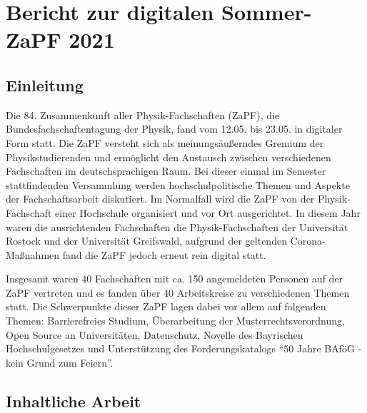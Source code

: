 \documentclass[a4paper, 11pt]{scrartcl}
\title{}
\author{}
\date{}
\begin{document}
\section*{Bericht zur digitalen Sommer-ZaPF 2021}

\subsection*{Einleitung}

Die 84. Zusammenkunft aller Physik-Fachschaften (ZaPF), die Bundesfachschaftentagung der Physik, fand vom 12.05. bis 23.05. in digitaler Form statt. Die ZaPF versteht sich als meinungsäußerndes Gremium der Physikstudierenden und ermöglicht den Austausch zwischen verschiedenen Fachschaften im deutschsprachigen Raum. Bei dieser einmal im Semester stattfindenden Versammlung werden hochschulpolitische Themen und Aspekte der Fachschaftsarbeit diskutiert. Im Normalfall wird die ZaPF von der Physik-Fachschaft einer Hochschule organisiert und vor Ort ausgerichtet. In diesem Jahr waren die ausrichtenden Fachschaften die Physik-Fachschaften der Universität Rostock und der Universität Greifswald, aufgrund der geltenden Corona-Maßnahmen fand die ZaPF jedoch erneut rein digital statt.

Insgesamt waren 40 Fachschaften mit ca. 150 angemeldeten Personen auf der ZaPF vertreten und es fanden über 40 Arbeitskreise zu verschiedenen Themen statt. Die Schwerpunkte dieser ZaPF lagen dabei vor allem auf folgenden Themen:
Barrierefreies Studium, Überarbeitung der Musterrechtsverordnung, Open Source an Universitäten, Datenschutz, Novelle des Bayrischen Hochschulgesetzes und Unterstützung des Forderungskatalogs “50 Jahre BAföG - kein Grund zum Feiern”.

\subsection*{Inhaltliche Arbeit}
\end{document}
